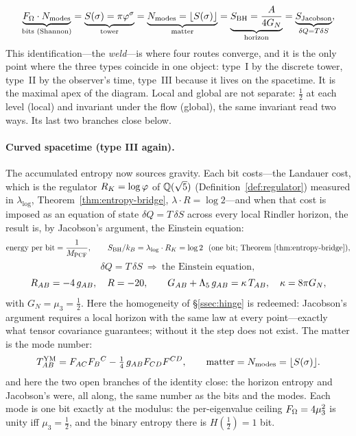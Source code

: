\begin{equation}\label{eq:obs-identity}
  \underbrace{F_\Omega\cdot N_{\mathrm{modes}}}_{\text{bits (Shannon)}}
   =\underbrace{S(\sigma)=\pi\varphi^{\sigma}}_{\text{tower}}
   =\underbrace{N_{\mathrm{modes}}=\lfloor S(\sigma)\rfloor}_{\text{matter}}
   =\underbrace{S_{\mathrm{BH}}=\frac{A}{4G_{N}}}_{\text{horizon}}
   =\underbrace{S_{\text{Jacobson}}}_{\delta Q=T\delta S},
\end{equation}
This identification---the \emph{weld}---is where four routes converge, and it is the only
point where the three types coincide in one object: type~I by the discrete tower, type~II
by the observer's time, type~III because it lives on the spacetime. It is the maximal apex
of the diagram. Local and global are not separate: $\tfrac12$ at each level (local) and
invariant under the flow (global), the same invariant read two ways. Its last two branches
close below.

\paragraph{Curved spacetime (type III again).}
The accumulated entropy now sources gravity. Each bit costs---the Landauer cost, which is the
regulator $R_K=\log\varphi$ of $\mathbb{Q}(\sqrt5)$ (Definition~\ref{def:regulator}) measured in
$\lambda_{\log}$, Theorem~\ref{thm:entropy-bridge},
$\lambda\cdot R=\log 2$---and when that cost is imposed as an equation of state
$\delta Q=T\,\delta S$ across every local Rindler horizon, the result is, by Jacobson's
argument, the Einstein equation:
\begin{equation}\label{landauer_energy_per_bit}
  \text{energy per bit}=\frac{1}{M_{\mathrm{PCF}}},\qquad
  S_{\mathrm{BH}}/k_B=\lambda_{\log}\cdot R_K=\log2\ \ (\text{one bit; Theorem~\ref{thm:entropy-bridge}}),
\end{equation}\begin{equation}\label{null_contraction_vanishes}
  \delta Q=T\,\delta S\ \Longrightarrow\ \text{the Einstein equation},
\end{equation}\begin{equation}\label{eq:obs-einstein}
  R_{AB}=-4\,g_{AB},\quad R=-20,\qquad G_{AB}+\Lambda_5\,g_{AB}=\kappa\,T_{AB},\quad
  \kappa=8\pi G_{N},
\end{equation}
with $G_N=\mu_3=\tfrac12$. Here the homogeneity of \S\ref{ssec:hinge} is redeemed:
Jacobson's argument requires a local horizon with the same law at every point---exactly
what tensor covariance guarantees; without it the step does not exist. The matter is the
mode number:
\begin{equation}\label{eq:obs-matter}
  T^{\mathrm{YM}}_{AB}=F_{AC}F_B{}^{C}-\tfrac14\,g_{AB}F_{CD}F^{CD},\qquad
  \text{matter}=N_{\mathrm{modes}}=\lfloor S(\sigma)\rfloor .
\end{equation}
and here the two open branches of the identity close: the horizon entropy and Jacobson's
were, all along, the same number as the bits and the modes. Each mode is one bit exactly at the
modulus: the per-eigenvalue ceiling $F_\Omega=4\mu_3^{2}$ is unity iff $\mu_3=\tfrac12$, and the
binary entropy there is $H(\tfrac12)=1$ bit.

